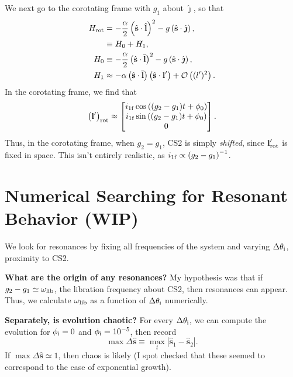 \documentclass[11pt,
        usenames, %
        dvipsnames %
    ]{article}
\newcommand*{\bm}[1]{\boldsymbol{\mathbf{#1}}}
\newcommand*{\uv}[1]{\hat{\bm{#1}}}
\newcommand*{\abs}[1]{\left|#1\right|}
\newcommand*{\p}[1]{\left(#1\right)}
\begin{document}
We next go to the corotating frame with $g_1$ about $\uv{\jmath}$, so that
\begin{align}
    H_{\rm rot} &= - \frac{\alpha}{2}\p{\uv{s} \cdot \uv{l}}^2
        - g\p{\uv{s} \cdot \uv{\jmath}},\\
        &\equiv H_0 + H_1,\\
    H_0 &\equiv - \frac{\alpha}{2}\p{\uv{s} \cdot \bar{\bm{l}}}^2
        - g\p{\uv{s} \cdot \uv{\jmath}},\\
    H_1 &\approx -\alpha\p{\uv{s} \cdot \bar{\bm{l}}}
        \p{\uv{s} \cdot \bm{l}'} + \mathcal{O}\p{(l')^2}.
\end{align}
In the corotating frame, we find that
\begin{equation}
    \p{\bm{l}'}_{\rm rot} \approx \begin{bmatrix}
        i_{\rm 1f} \cos\p{(g_2 - g_1) t + \phi_0}\\
        i_{\rm 1f} \sin\p{(g_2 - g_1) t + \phi_0}\\
        0
    \end{bmatrix}.
\end{equation}
Thus, in the corotating frame, when $g_2 = g_1$, CS2 is simply \emph{shifted},
since $\bm{l}'_{\rm rot}$ is fixed in space. This isn't entirely realistic, as
$i_{\rm 1f} \propto \p{g_2 - g_1}^{-1}$.

\section{Numerical Searching for Resonant Behavior (WIP)}

We look for resonances by fixing all frequencies of the system and varying
$\Delta \theta_{\rm i}$, proximity to CS2.

\textbf{What are the origin of any resonances?} My hypothesis was that if $g_2 -
g_1 \simeq \omega_{\rm lib}$, the libration frequency about CS2, then resonances
can appear. Thus, we calculate $\omega_{\rm lib}$ as a function of $\Delta
\theta_{\rm i}$ numerically.

\textbf{Separately, is evolution chaotic?} For every $\Delta \theta_{\rm i}$, we
can compute the evolution for $\phi_{\rm i} = 0$ and $\phi_{\rm i} = 10^{-5}$,
then record
\begin{equation}
    \max \Delta \uv{s} \equiv \max_t \abs{\uv{s}_1 - \uv{s}_2}.
\end{equation}
If $\max \Delta \uv{s} \simeq 1$, then chaos is likely (I spot checked that
these seemed to correspond to the case of exponential growth).
\end{document}
